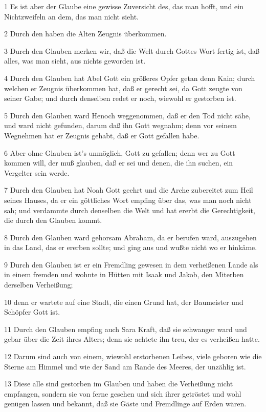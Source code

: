 \par 1 Es ist aber der Glaube eine gewisse Zuversicht des, das man hofft, und ein Nichtzweifeln an dem, das man nicht sieht.
\par 2 Durch den haben die Alten Zeugnis überkommen.
\par 3 Durch den Glauben merken wir, daß die Welt durch Gottes Wort fertig ist, daß alles, was man sieht, aus nichts geworden ist.
\par 4 Durch den Glauben hat Abel Gott ein größeres Opfer getan denn Kain; durch welchen er Zeugnis überkommen hat, daß er gerecht sei, da Gott zeugte von seiner Gabe; und durch denselben redet er noch, wiewohl er gestorben ist.
\par 5 Durch den Glauben ward Henoch weggenommen, daß er den Tod nicht sähe, und ward nicht gefunden, darum daß ihn Gott wegnahm; denn vor seinem Wegnehmen hat er Zeugnis gehabt, daß er Gott gefallen habe.
\par 6 Aber ohne Glauben ist's unmöglich, Gott zu gefallen; denn wer zu Gott kommen will, der muß glauben, daß er sei und denen, die ihn suchen, ein Vergelter sein werde.
\par 7 Durch den Glauben hat Noah Gott geehrt und die Arche zubereitet zum Heil seines Hauses, da er ein göttliches Wort empfing über das, was man noch nicht sah; und verdammte durch denselben die Welt und hat ererbt die Gerechtigkeit, die durch den Glauben kommt.
\par 8 Durch den Glauben ward gehorsam Abraham, da er berufen ward, auszugehen in das Land, das er ererben sollte; und ging aus und wußte nicht wo er hinkäme.
\par 9 Durch den Glauben ist er ein Fremdling gewesen in dem verheißenen Lande als in einem fremden und wohnte in Hütten mit Isaak und Jakob, den Miterben derselben Verheißung;
\par 10 denn er wartete auf eine Stadt, die einen Grund hat, der Baumeister und Schöpfer Gott ist.
\par 11 Durch den Glauben empfing auch Sara Kraft, daß sie schwanger ward und gebar über die Zeit ihres Alters; denn sie achtete ihn treu, der es verheißen hatte.
\par 12 Darum sind auch von einem, wiewohl erstorbenen Leibes, viele geboren wie die Sterne am Himmel und wie der Sand am Rande des Meeres, der unzählig ist.
\par 13 Diese alle sind gestorben im Glauben und haben die Verheißung nicht empfangen, sondern sie von ferne gesehen und sich ihrer getröstet und wohl genügen lassen und bekannt, daß sie Gäste und Fremdlinge auf Erden wären.
